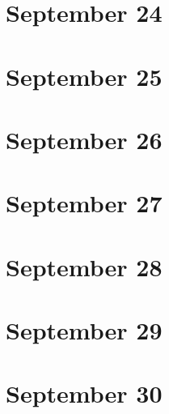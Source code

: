 \section{September 24}

\section{September 25}

\section{September 26}

\section{September 27}

\section{September 28}

\section{September 29}

\section{September 30}

